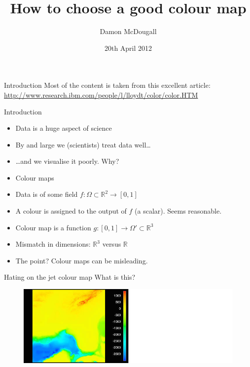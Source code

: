 \documentclass[10pt,presentation,compress]{beamer}
\title{How to choose a good colour map}
\author{Damon McDougall}
\institute{Institute for Computational and Engineering Sciences, UT Austin, USA}
\date{20th April 2012}
\begin{document}
\begin{frame}
  \titlepage
\end{frame}

\begin{frame}{Introduction}
  Most of the content is taken from this excellent article:
  \linebreak
  \linebreak
  \textcolor{blue}{\small{\url{http://www.research.ibm.com/people/l/lloydt/color/color.HTM}}}
\end{frame}

\begin{frame}{Introduction}
  \begin{itemize}
    \item Data is a huge aspect of science
    \item By and large we (scientists) treat data well\dots
    \item \dots and we visualise it poorly.  Why?
    \item Colour maps
    \item Data is of some field
      $f : \Omega \subset \mathbb{R}^2 \to [0, 1]$
    \item A colour is assigned to the output of $f$ (a scalar).  Seems
      reasonable.
    \item Colour map is a function
      $g : [0, 1] \to \Omega' \subset \mathbb{R}^3$
    \item Mismatch in dimensions:  $\mathbb{R}^3$ versus $\mathbb{R}$
    \item The point?  Colour maps can be misleading.
  \end{itemize}
\end{frame}

\begin{frame}{Hating on the jet colour map}
  What is this?
  \begin{figure}[htp]
    \includegraphics[scale=7.0]{florida_masked.jpg}
  \end{figure}
\end{frame}
\end{document}
